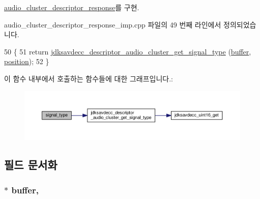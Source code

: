 \hyperlink{classavdecc__lib_1_1audio__cluster__descriptor__response_ac204637e5ecfc30b4cc47c0d78d81ce1}{audio\+\_\+cluster\+\_\+descriptor\+\_\+response}를 구현.



audio\+\_\+cluster\+\_\+descriptor\+\_\+response\+\_\+imp.\+cpp 파일의 49 번째 라인에서 정의되었습니다.


\begin{DoxyCode}
50 \{
51     \textcolor{keywordflow}{return} \hyperlink{group__descriptor__audio__cluster_ga76d46b9ee4647320d0c7728e45ef657c}{jdksavdecc\_descriptor\_audio\_cluster\_get\_signal\_type}
      (\hyperlink{classavdecc__lib_1_1descriptor__response__base__imp_a56ed84df35de10bdb65e72b184309497}{buffer}, \hyperlink{classavdecc__lib_1_1descriptor__response__base__imp_a7a04afe5347934be732ec70a70bd0a28}{position});
52 \}
\end{DoxyCode}


이 함수 내부에서 호출하는 함수들에 대한 그래프입니다.\+:
\nopagebreak
\begin{figure}[H]
\begin{center}
\leavevmode
\includegraphics[width=350pt]{classavdecc__lib_1_1audio__cluster__descriptor__response__imp_a34860693b568102d329b58e59fc48de5_cgraph}
\end{center}
\end{figure}




\subsection{필드 문서화}
\subsubsection[{\texorpdfstring{buffer}{buffer}}]{$\ast$ buffer\hspace{0.3cm}{\ttfamily [protected]}, {\ttfamily [inherited]}}\hypertarget{classavdecc__lib_1_1descriptor__response__base__imp_a56ed84df35de10bdb65e72b184309497}{}\label{classavdecc__lib_1_1descriptor__response__base__imp_a56ed84df35de10bdb65e72b184309497}


